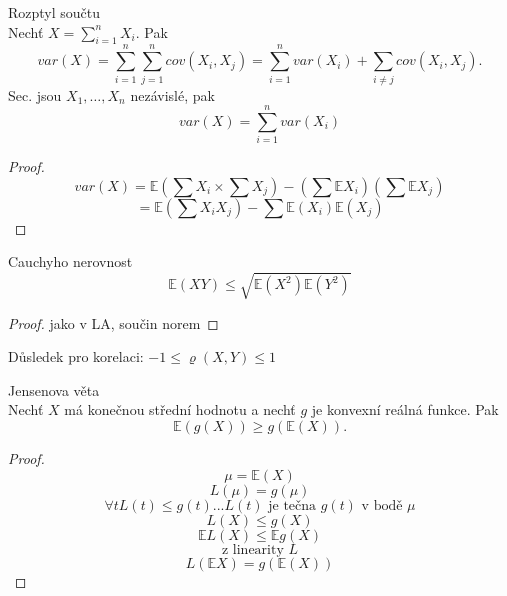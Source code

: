 \documentclass[../main.tex]{subfiles}
\begin{document}
\begin{theorem}
    Rozptyl součtu\\

    Nechť $X = \sum^n_{i=1}X_i$. Pak
    \[var(X) = \sum^n_{i=1}\sum^n_{j=1}cov(X_i,X_j) = \sum^n_{i=1}var(X_i) + \sum_{i\neq j} cov(X_i,X_j).\]
    Sec. jsou $X_1, \dots, X_n$ nezávislé, pak
    \[var(X) = \sum^n_{i=1}var(X_i)\]
    \begin{proof}
        \[var(X) = \mathbb{E}(\sum X_i \times \sum X_j) - (\sum \mathbb{E}X_i)(\sum \mathbb{E}X_j)\]
        \[= \mathbb{E}(\sum X_iX_j) - \sum \mathbb{E}(X_i)\mathbb{E}(X_j)\]
    \end{proof}
\end{theorem}

\begin{theorem}
    Cauchyho nerovnost\\
    \[\mathbb{E}(XY) \leq \sqrt{\mathbb{E}(X^2)\mathbb{E}(Y^2)}\]
    \begin{proof}
        jako v LA, součin norem 
    \end{proof}

    \begin{remark}
        Důsledek pro korelaci: $-1 \leq \varrho(X,Y) \leq 1$
    \end{remark}
\end{theorem}

\begin{theorem}
    Jensenova věta\\

    Nechť $X$ má konečnou střední hodnotu a nechť $g$ je konvexní reálná funkce. Pak 
    \[\mathbb{E}(g(X))\geq g(\mathbb{E}(X)).\]
    \begin{proof}
        \[\mu = \mathbb{E}(X)\]
        \[L(\mu) = g(\mu)\]
        \[\forall t L(t) \leq g(t) ... \text{$L(t)$ je tečna $g(t)$ v bodě $\mu$}\]
        \[L(X) \leq g(X)\]
        \[\mathbb{E}L(X) \leq \mathbb{E}g(X)\]
        \[\text{z linearity $L$}\]
        \[L(\mathbb{E}X) = g(\mathbb{E}(X))\]
    \end{proof}
\end{theorem}
\end{document}
